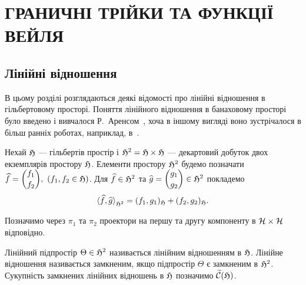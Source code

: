 
\section {ГРАНИЧНІ ТРІЙКИ ТА ФУНКЦІЇ ВЕЙЛЯ}

\subsection{Лінійні відношення} %
\label{Subsec-Linear-relations}

В цьому розділі розглядаються деякі відомості про лінійні відношення в гільбертовому просторі. Поняття лінійного відношення в банаховому просторі було введено і вивчалося Р.~Аренсом~\cite{Arens1961}, хоча в іншому вигляді воно зустрічалося в більш ранніх роботах, наприклад, в~\cite{Calkin1939}.

Нехай $\mathfrak{H}$ --- гільбертів простір і $\mathfrak{H}^2 = \mathfrak{H} \times \mathfrak{H}$ --- декартовий добуток двох екземплярів простору $\mathfrak{H}$. 
Елементи простору $\mathfrak{H}^2$ будемо позначати $\widehat f = \dbinom{f_1}{f_2},\ (f_1,f_2 \in \mathfrak{H})$. Для $\widehat f \in \mathfrak{H}^2$ та $\widehat g = \dbinom{g_1}{g_2} \in \mathfrak{H}^2$ покладемо
\begin{equation}
 	{\langle \widehat f,\widehat g\rangle}_{\mathfrak{H}^2} = (f_1,g_1)_{\mathfrak{H}} + (f_2,g_2)_{\mathfrak{H}}.
\end{equation} 

Позначимо через $\pi_1$ та $\pi_2$ проектори на першу та другу компоненту в $\mathcal{H} \times \mathcal{H}$ відповідно.

\begin{definition}
	Лінійний підпростір $\Theta \in \mathfrak{H}^2$ називається лінійним відношенням в $\mathfrak{H}$. Лінійне відношення називається замкненим, якщо підпростір $\Theta$ є замкненим в $\mathfrak{H}^2$. Сукупність замкнених лінійних відношень в $\mathfrak{H}$ позначимо $\widetilde {\mathcal{C}}(\mathfrak{H})$. 
\end{definition}

